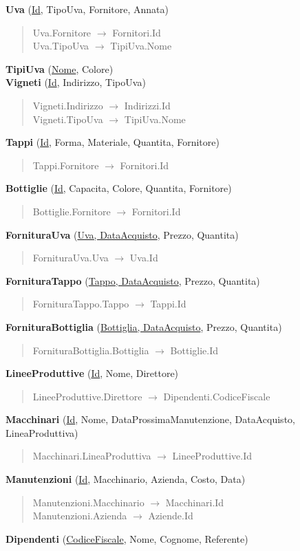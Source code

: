 \textbf{Uva} (\underline{Id}, TipoUva, Fornitore, Annata)
\begin{verse}
	Uva.Fornitore $\to$ Fornitori.Id\\
	Uva.TipoUva $\to$ TipiUva.Nome
\end{verse}
\textbf{TipiUva} (\underline{Nome}, Colore)\\
\textbf{Vigneti} (\underline{Id}, Indirizzo, TipoUva)
\begin{verse}
	Vigneti.Indirizzo $\to$ Indirizzi.Id\\
	Vigneti.TipoUva $\to$ TipiUva.Nome\\
\end{verse}
\textbf{Tappi} (\underline{Id}, Forma, Materiale, Quantita, Fornitore)
\begin{verse}
	Tappi.Fornitore $\to$ Fornitori.Id
\end{verse}
\textbf{Bottiglie} (\underline{Id}, Capacita, Colore, Quantita, Fornitore)
\begin{verse}
	Bottiglie.Fornitore $\to$ Fornitori.Id
\end{verse}
\textbf{FornituraUva} (\underline{Uva, DataAcquisto}, Prezzo, Quantita)
\begin{verse}
	FornituraUva.Uva $\to$ Uva.Id
\end{verse}
\textbf{FornituraTappo} (\underline{Tappo, DataAcquisto}, Prezzo, Quantita)
\begin{verse}
	FornituraTappo.Tappo $\to$ Tappi.Id
\end{verse}
\textbf{FornituraBottiglia} (\underline{Bottiglia, DataAcquisto}, Prezzo, Quantita)
\begin{verse}
	FornituraBottiglia.Bottiglia $\to$ Bottiglie.Id
\end{verse}
\textbf{LineeProduttive} (\underline{Id}, Nome, Direttore)
\begin{verse}
	LineeProduttive.Direttore $\to$ Dipendenti.CodiceFiscale
\end{verse}
\textbf{Macchinari} (\underline{Id}, Nome, DataProssimaManutenzione, DataAcquisto, LineaProduttiva)
\begin{verse}
	Macchinari.LineaProduttiva $\to$ LineeProduttive.Id
\end{verse}
\textbf{Manutenzioni} (\underline{Id}, Macchinario, Azienda, Costo, Data)
\begin{verse}
	Manutenzioni.Macchinario $\to$ Macchinari.Id\\
	Manutenzioni.Azienda $\to$ Aziende.Id
\end{verse}
\textbf{Dipendenti} (\underline{CodiceFiscale}, Nome, Cognome, Referente)
